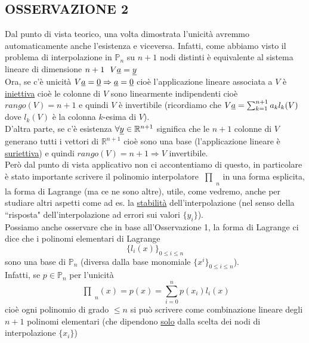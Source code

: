 \documentclass[12pt,headings=optiontohead]{article}
\newcommand{\inter}{\begin{matrix}\prod\end{matrix}}
\begin{document}
\subsection{OSSERVAZIONE 2}
Dal punto di vista teorico, una volta dimostrata l'unicità avremmo automaticamente
anche l'esistenza e viceversa. Infatti, come abbiamo visto il problema di interpolazione in $\mathbb{P}_n$ su $n+1$ nodi distinti è equivalente al sistema lineare di dimensione $n+1 \ \ V\uline{a} = \uline{y}$\\
Ora, se c'è unicità $V\uline{a} = \uline{0} \Rightarrow \uline{a} = \uline{0}$ cioè l'applicazione lineare associata a $V$ è \uline{iniettiva} cioè le colonne di $V$ sono linearmente indipendenti cioè $rango(V)=n+1$ e quindi $V$ è invertibile (ricordiamo che $V \uline{a} = \sum_{k=1}^{n+1} a_k l_k(V)$ dove $l_k(V)$ è la colonna $k$-esima di $V$).\\
D'altra parte, se c'è esistenza $\forall \uline{y} \in \mathbb{R}^{n+1}$ significa che le $n+1$ colonne di $V$ generano tutti i vettori di $\mathbb{R}^{n+1}$ cioè sono una base (l'applicazione lineare è \uline{suriettiva}) e quindi $rango(V)=n+1 \Rightarrow V$ invertibile.\\
Però dal punto di vista applicativo non ci accontentiamo di questo, in particolare è stato importante scrivere il polinomio interpolatore $\inter_n$ in una forma esplicita, la forma di Lagrange (ma ce ne sono altre), utile, come vedremo, anche per studiare altri aspetti come ad es. la \uline{stabilità} dell'interpolazione (nel
senso della ``risposta" dell'interpolazione ad errori sui valori $\{y_i\}$).\\
Possiamo anche osservare che in base all'Osservazione 1, la forma di Lagrange ci dice che i polinomi elementari di Lagrange
\[ \{l_i(x)\}_{0 \le i \le n} \]
sono una base di $\mathbb{P}_n$ (diversa dalla base monomiale $\{x^i\}_{0 \le i \le n}$). \\
Infatti, se $p \in \mathbb{P}_n$ per l'unicità
\[\inter_n(x) = p(x) = \sum_{i=0}^n p(x_i) l_i(x)\]
cioè ogni polinomio di grado $\le n$ si può scrivere come combinazione lineare degli $n+1$ polinomi elementari
(che dipendono \uline{solo} dalla scelta dei nodi di interpolazione $\{x_i\}$)
\end{document}
